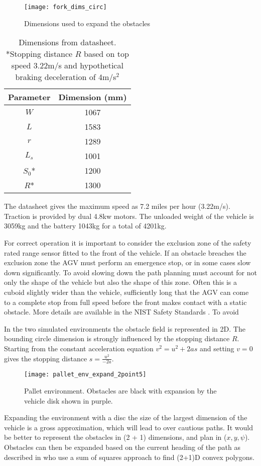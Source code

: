 \begin{figure}
	\texttt{[image: fork\_dims\_circ]}
	\label{fig:fork_dims_circ}
	\caption{Dimensions used to expand the obstacles}
\end{figure}
\begin{table}
	\begin{center}
		\begin{tabular}{ |c|c| }
			\hline
			Parameter & Dimension (mm) \\
			\hline
			$W$ & 1067 \\
			$L$ & 1583 \\
			$r$ & 1289 \\
			$L_s$ & 1001 \\
			$S_0$* & 1200 \\
			$R$* & 1300 \\
			\hline  
		\end{tabular} 
	\end{center}
	\label{tab:dimensions}
	\caption{Dimensions from datasheet. *Stopping distance $R$ based on top speed 3.22m/s and hypothetical braking deceleration of 4m/s$^2$} 
\end{table}
The datasheet gives the maximum speed as 7.2 miles per hour (3.22m/s). Traction is provided by dual 4.8kw motors. The unloaded weight of the vehicle is 3059kg and the battery 1043kg for a total of 4201kg.  

For correct operation it is important to consider the exclusion zone of the safety rated range sensor fitted to the front of the vehicle. If an obstacle breaches the exclusion zone the AGV must perform an emergence stop, or in some cases slow down significantly. To avoid slowing down the path planning must account for not only the shape of the vehicle but also the shape of this zone. Often this is a cuboid slightly wider than the vehicle, sufficiently long that the AGV can come to a complete stop from full speed before the front makes contact with a static obstacle. More details are available in the NIST Safety Standards \cite{Bostelmann2013}. To avoid 

In the two simulated environments the obstacle field is represented in 2D. The bounding circle dimension is strongly influenced by the stopping distance $R$. 
Starting from the constant acceleration equation
$v^2 = u^2  + 2as$ and setting $v=0$ gives the stopping distance $s = \frac{u^2}{-2a}$. 
\begin{figure}
	\texttt{[image: pallet\_env\_expand\_2point5]}
	\label{fig:pallet_env}
	\caption{Pallet environment. Obstacles are black with expansion by the vehicle disk shown in purple.}
\end{figure}

Expanding the environment with a disc the size of the largest dimension of the vehicle is a gross approximation, which will lead to over cautious paths. It would be better to represent the obstacles in (2 + 1) dimensions, and plan in ($x, y, \psi$). Obstacles can then be expanded based on the current heading of the path as described in \cite{Deits2015b} who use a sum of squares approach to find (2+1)D convex polygons. 